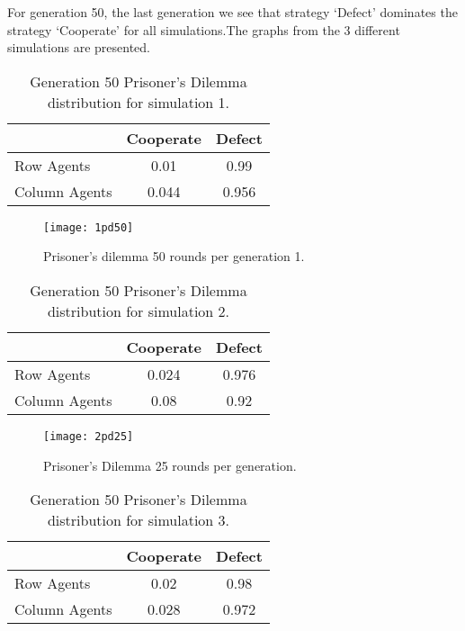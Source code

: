 \documentclass{book}
\begin{document}
For generation 50, the last generation we see that strategy `Defect' dominates the strategy `Cooperate' for all simulations.The graphs from the 3 different simulations are presented.

\begin{table}[H]
\begin{center}
\begin{tabular}{|l|c|c|}
\hline
& Cooperate & Defect \\ 
\hline
Row Agents & 0.01 & 0.99\\
\hline
Column Agents & 0.044 & 0.956\\
\hline
\end{tabular}
\end{center}
\caption{ Generation 50 Prisoner’s Dilemma distribution for simulation 1.}
\label{tab:pds1g50}
\end{table}



\begin{figure}[H]
\begin{center}
	\texttt{[image: 1pd50]}


\caption{ Prisoner's dilemma 50 rounds per generation 1.}
\label{fig:pds1}
\end{center}
\end{figure}

\begin{table}[H]
\begin{center}
\begin{tabular}{|l|c|c|}
\hline
& Cooperate & Defect \\ 
\hline
Row Agents & 0.024 & 0.976\\
\hline
Column Agents & 0.08 & 0.92\\
\hline
\end{tabular}
\end{center}
\caption{Generation 50 Prisoner’s Dilemma distribution for simulation 2.}
\label{tab:pds2g50}
 \end{table}

\begin{figure}[H]
\begin{center}
	\texttt{[image: 2pd25]}

\caption{ Prisoner's Dilemma 25 rounds per generation.}
\label{fig:pds2}
\end{center}
\end{figure}

\begin{table}[H]
\begin{center}
\begin{tabular}{|l|c|c|}
\hline
& Cooperate & Defect \\ 
\hline
Row Agents & 0.02 & 0.98\\
\hline
Column Agents & 0.028 & 0.972\\
\hline
\end{tabular}
\end{center}
\caption{Generation 50 Prisoner’s Dilemma distribution for simulation 3.}
\label{tab:pds3g50}
 \end{table}
\end{document}
